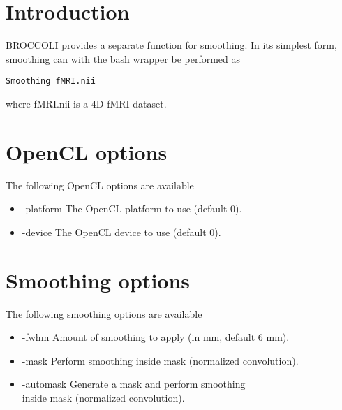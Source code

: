 \section{Introduction}

BROCCOLI provides a separate function for smoothing. In its simplest form, smoothing can with the bash wrapper be performed as

\begin{verbatim}
Smoothing fMRI.nii
\end{verbatim}
where fMRI.nii is a 4D fMRI dataset.

\section{OpenCL options}

The following OpenCL options are available

\begin{itemize}

\item -platform
\newline \newline The OpenCL platform to use (default 0).

\item -device
\newline \newline The OpenCL device to use (default 0).

\end{itemize}

\section{Smoothing options}

The following smoothing options are available

\begin{itemize}

\item -fwhm
\newline \newline Amount of smoothing to apply (in mm, default 6 mm).

\item -mask
\newline \newline Perform smoothing inside mask (normalized convolution).

\item -automask
\newline \newline Generate a mask and perform smoothing \\ inside mask (normalized convolution).

\end{itemize}

